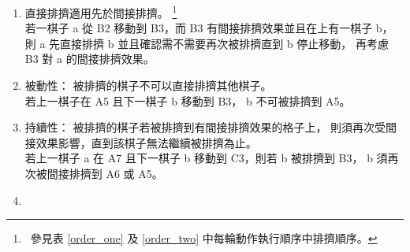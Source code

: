 \documentclass[11pt,a4paper]{article}
\begin{document}
\begin{enumerate}
{			\zB 假設在遊戲版本二下，玩家二在最後一部動作直接排擠掉自己的棋子，
			則決定下一輪有間接效果的棋子是該被直接排擠的棋子，
			而非造成直接排擠的棋子。}
		a 所在之格會決定一些其他格 （由以下列點表述）
		使得若下一個被移動的棋子 b 移動到這些格上，
		則 b 依照排擠規則排擠。
			\footnote{\ 下一個棋子指的是這輪中移動的棋子
			（如果在遊戲規則版本二下則是這輪中棋子），
			縱使上一個棋子 a 在這輪中被排擠，有間接效果的格子不變。
			詳細排擠流程請參見表 \ref{order_one} 及 \ref{order_two}。}
		這些可以間接排擠棋子的格子稱為有。
		\begin{enumerate}
			\item
				若上一個棋子 a 在 A 階的 A$m$ 格上，
				則在 A 階中從 A$m$ 逆時針數的第 4、8 及 12 個（3 個）與 B、C 階中和 A$m$
				顏色相同的所有格（8 個）有間接排擠效果。\\
				\zB 若上一個棋子 a 移動到 A5，
				則 A1、A9、A13（A 階中與 A5 組成十字架對應到的格）、
				B1、B3、B5、B7、C1、C3、C5、C7（B、C 階中跟 A5 顏色相同的格）
				共 11 格有間接排擠效果。 亦即，
				而下一個棋子 b 若移動到這 11 格任一格上， b 就要被排擠；
				假設 b 是移動到 B1，b 就要被排擠到 A1 或 A2；
				假設 b 是移動到 A9，b 就要被排擠到 F。
			\item
				若上一個棋子 a 在 B 階的 B$m$ 格上，
				則在 B、C 階中和 B$m$ 顏色相同、不含 B$m$ 本身的所有格（7 個）有間接排擠效果。
			\item
				若上一個棋子 a 在 C 階的 C$m$ 格上，
				則在 C 階中和 C$m$ 顏色相同、不含 C$m$ 本身的所有格（3 個）有間接排擠效果。
		\end{enumerate}
	\item \label{order}
		直接排擠適用先於間接排擠。
			\footnote{\ 參見表 \ref{order_one} 及 \ref{order_two} 中每輪動作執行順序中排擠順序。}\\
		\zB 若一棋子 a 從 B2 移動到 B3，而 B3 有間接排擠效果並且在上有一棋子 b，
		則 a 先直接排擠 b 並且確認需不需要再次被排擠直到 b 停止移動，
		再考慮 B3 對 a 的間接排擠效果。
	\item \label{passive}
		\textsf{被動性}：
		被排擠的棋子不可以直接排擠其他棋子。\\
		\zB 若上一棋子在 A5 且下一棋子 b 移動到 B3， b 不可被排擠到 A5。
	\item \label{conti}
		\textsf{持續性}：
		被排擠的棋子若被排擠到有間接排擠效果的格子上，
		則須再次受間接效果影響，直到該棋子無法繼續被排擠為止。\\
		\zB 若上一棋子 a 在 A7 且下一棋子 b 移動到 C3，則若 b 被排擠到 B3，
		b 須再次被間接排擠到 A6 或 A5。
	\item \label{add}

\end{enumerate}
\end{document}
